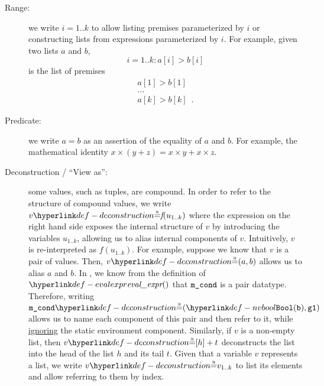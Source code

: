 \begin{description}
  \item[Range:] we write $i=1..k$ to allow listing premises parameterized by $i$ or constructing
  lists from expressions parameterized by $i$.
  For example, given two lists $a$ and $b$,
  \[
    i=1..k: a[i] > b[i]
  \]
  is the list of premises
  \[
    \begin{array}{l}
    a[1] > b[1]\\
    \ldots\\
    a[k] > b[k] \enspace.
    \end{array}
  \]

  \item[Predicate:] we write $a = b$ as an assertion of the equality of $a$ and $b$.
  For example, the mathematical identity $x \times (y + z) = x \times y + x \times z$.

  \hypertarget{def-deconstruction}{}
  \item[Deconstruction / ``View as'':] some values, such as tuples, are compound. In order to refer to the structure
  of compound values, we write $v \eqname \textit{f}(u_{1..k})$ where the expression on the right
  hand side exposes the internal structure of $v$ by introducing the variables
  $u_{1..k}$, allowing us to alias internal components of $v$.
  Intuitively, $v$ is re-interpreted as $\textit{f}(u_{1..k})$.
  For example, suppose we know that $v$ is a pair of values.
  Then, $v \eqname (a, b)$ allows us to alias $a$ and $b$.
  In , we know from the definition of $\evalexpr$ that
  $\texttt{m\_cond}$ is a pair datatype.
  Therefore, writing $\mcond \eqname (\nvbool(\vb), \vgone)$ allows us to name each component of this pair
  and then refer to it, while \hyperlink{def-ignore}{ignoring} the static environment component.
  Similarly, if $v$ is a non-empty list, then $v \eqname [h] + t$ deconstructs the list into the
  head of the list $h$ and its tail $t$.
  Given that a variable $v$ represents a list, we write $v \eqname v_{1..k}$ to list its elements and allow
  referring to them by index.


\end{description}
